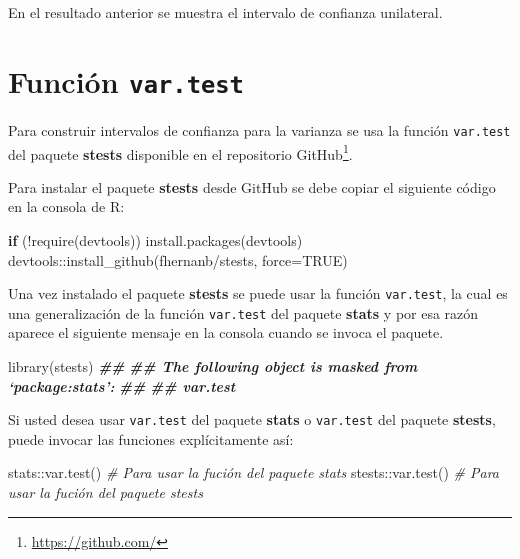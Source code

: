 \documentclass[
]{book}
\makeatletter
\newenvironment{Shaded}{\begin{snugshade}}{\end{snugshade}}
\newcommand{\AttributeTok}[1]{\textcolor[rgb]{0.77,0.63,0.00}{#1}}
\newcommand{\CommentTok}[1]{\textcolor[rgb]{0.56,0.35,0.01}{\textit{#1}}}
\newcommand{\ConstantTok}[1]{\textcolor[rgb]{0.00,0.00,0.00}{#1}}
\newcommand{\ControlFlowTok}[1]{\textcolor[rgb]{0.13,0.29,0.53}{\textbf{#1}}}
\newcommand{\DocumentationTok}[1]{\textcolor[rgb]{0.56,0.35,0.01}{\textbf{\textit{#1}}}}
\newcommand{\FunctionTok}[1]{\textcolor[rgb]{0.00,0.00,0.00}{#1}}
\newcommand{\NormalTok}[1]{#1}
\newcommand{\SpecialCharTok}[1]{\textcolor[rgb]{0.00,0.00,0.00}{#1}}
\newcommand{\StringTok}[1]{\textcolor[rgb]{0.31,0.60,0.02}{#1}}
\renewcommand{\href}[2]{#2\footnote{\url{#1}}}
\newenvironment{kframe}{%
\medskip{}
\setlength{\fboxsep}{.8em}
 \def\at@end@of@kframe{}%
 \ifinner\ifhmode%
  \def\at@end@of@kframe{\end{minipage}}%
  \begin{minipage}{\columnwidth}%
 \fi\fi%
 \def\FrameCommand##1{\hskip\@totalleftmargin \hskip-\fboxsep
 \colorbox{shadecolor}{##1}\hskip-\fboxsep
     \hskip-\linewidth \hskip-\@totalleftmargin \hskip\columnwidth}%
 \MakeFramed {\advance\hsize-\width
   \@totalleftmargin\z@ \linewidth\hsize
   \@setminipage}}%
 {\par\unskip\endMakeFramed%
 \at@end@of@kframe}
\renewenvironment{Shaded}{\begin{kframe}}{\end{kframe}}
\makeatother
\begin{document}
En el resultado anterior se muestra el intervalo de confianza unilateral.

\hypertarget{funciuxf3n-var.test}{%
\section{\texorpdfstring{Función \texttt{var.test}}{Función var.test}}\label{funciuxf3n-var.test}}

Para construir intervalos de confianza para la varianza se usa la función \texttt{var.test} del paquete \textbf{stests} \citep{R-usefultools} disponible en el repositorio \href{https://github.com/}{GitHub}.

Para instalar el paquete \textbf{stests} desde GitHub se debe copiar el siguiente código en la consola de R:

\begin{Shaded}
\begin{Highlighting}[]
\ControlFlowTok{if}\NormalTok{ (}\SpecialCharTok{!}\FunctionTok{require}\NormalTok{(}\StringTok{\textquotesingle{}devtools\textquotesingle{}}\NormalTok{)) }\FunctionTok{install.packages}\NormalTok{(}\StringTok{\textquotesingle{}devtools\textquotesingle{}}\NormalTok{)}
\NormalTok{devtools}\SpecialCharTok{::}\FunctionTok{install\_github}\NormalTok{(}\StringTok{\textquotesingle{}fhernanb/stests\textquotesingle{}}\NormalTok{, }\AttributeTok{force=}\ConstantTok{TRUE}\NormalTok{)}
\end{Highlighting}
\end{Shaded}

Una vez instalado el paquete \textbf{stests} se puede usar la función \texttt{var.test}, la cual es una generalización de la función \texttt{var.test} del paquete \textbf{stats} y por esa razón aparece el siguiente mensaje en la consola cuando se invoca el paquete.

\begin{Shaded}
\begin{Highlighting}[]
\FunctionTok{library}\NormalTok{(stests)}
\DocumentationTok{\#\# }
\DocumentationTok{\#\# The following object is masked from ‘package:stats’:}
\DocumentationTok{\#\# }
\DocumentationTok{\#\#     var.test}
\end{Highlighting}
\end{Shaded}

Si usted desea usar \texttt{var.test} del paquete \textbf{stats} o \texttt{var.test} del paquete \textbf{stests}, puede invocar las funciones explícitamente así:

\begin{Shaded}
\begin{Highlighting}[]
\NormalTok{stats}\SpecialCharTok{::}\FunctionTok{var.test}\NormalTok{()   }\CommentTok{\# Para usar la fución del paquete stats}
\NormalTok{stests}\SpecialCharTok{::}\FunctionTok{var.test}\NormalTok{()  }\CommentTok{\# Para usar la fución del paquete stests}
\end{Highlighting}
\end{Shaded}
\end{document}
